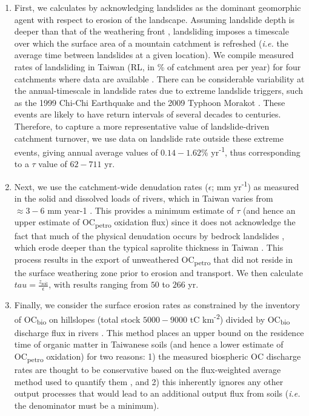 \begin{enumerate}[label=(\textit{\roman*})]

\item First, we calculates  by acknowledging landslides as the dominant geomorphic agent with respect to erosion of the landscape. Assuming landslide depth is deeper than that of the weathering front \citep[$\approx 0.8$ m;][]{Tsai:2001vp}, landsliding imposes a timescale over which the surface area of a mountain catchment is refreshed (\textit{i.e.} the average time between landslides at a given location). We compile measured rates of landsliding in Taiwan (RL, in \% of catchment area per year) for four catchments where data are available \citep[Table \ref{Ch6Tab:S8};][]{Chang:2002wr,Chang:2007fm,Lin:2008fy,Chen:2013eh,Chen:2015hs}. There can be considerable variability at the annual-timescale in landslide rates \citep{Lin:2008fy} due to extreme landslide triggers, such as the 1999 Chi-Chi Earthquake \citep{Hovius:2011kc} and the 2009 Typhoon Morakot \citep{West:2011eo}. These events are likely to have return intervals of several decades to centuries. Therefore, to capture a more representative value of landslide-driven catchment turnover, we use data on landslide rate outside these extreme events, giving annual average values of $0.14 - 1.62$\% yr\textsuperscript{-1}, thus corresponding to a $\tau$ value of $62 - 711$ yr.

\item Next, we use the catchment-wide denudation rates ($\epsilon$; mm yr\textsuperscript{-1}) as measured in the solid and dissolved loads of rivers, which in Taiwan varies from $\approx 3 - 6$ mm year-1 \citep{Dadson:2003kl}. This provides a minimum estimate of $\tau$ (and hence an upper estimate of OC\textsubscript{petro} oxidation flux) since it does not acknowledge the fact that much of the physical denudation occurs by bedrock landslides \citep{Hovius:2000ht}, which erode deeper than the typical saprolite thickness in Taiwan \citep[\textit{i.e.} $\approx 0.8 m$;][]{Tsai:2001vp,Larsen:2010dr}. This process results in the export of unweathered OC\textsubscript{petro} that did not reside in the surface weathering zone prior to erosion and transport. We then calculate $tau = \frac{z_{\text{soil}}}{\epsilon}$, with results ranging from $50$ to $266$ yr.

\item Finally, we consider the surface erosion rates as constrained by the inventory of OC\textsubscript{bio} on hillslopes (total stock $5000 - 9000$ tC km\textsuperscript{-2}) divided by OC\textsubscript{bio} discharge flux in rivers \citep[$11 - 31$ tons C km\textsuperscript{-2} yr\textsuperscript{-1};][]{Hilton:2012dt}. This method places an upper bound on the residence time of organic matter in Taiwanese soils (and hence a lower estimate of OC\textsubscript{petro} oxidation) for two reasons: 1) the measured biospheric OC discharge rates are thought to be conservative based on the flux-weighted average method used to quantify them \citep{Hilton:2012dt}, and 2) this inherently ignores any other output processes that would lead to an additional output flux from soils (\textit{i.e.} the denominator must be a minimum).


\end{enumerate}
